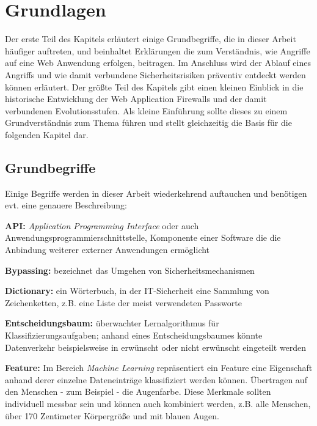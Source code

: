 \chapter{Grundlagen}



Der erste Teil des Kapitels erläutert einige Grundbegriffe, die in dieser Arbeit häufiger auftreten, und beinhaltet Erklärungen die zum Verständnis, wie Angriffe auf eine Web Anwendung erfolgen, beitragen. Im Anschluss wird der Ablauf eines Angriffs und wie damit verbundene Sicherheitsrisiken präventiv entdeckt werden können erläutert. Der größte Teil des Kapitels gibt einen kleinen Einblick in die historische Entwicklung der Web Application Firewalls und der damit verbundenen Evolutionsstufen. Als kleine Einführung sollte dieses zu einem Grundverständnis zum Thema führen und stellt gleichzeitig die Basis für die folgenden Kapitel dar.

\section{Grundbegriffe}
Einige Begriffe werden in dieser Arbeit wiederkehrend auftauchen und benötigen evt. eine genauere Beschreibung:

\textbf{API:} \emph{Application Programming Interface} oder auch Anwendungsprogrammierschnittstelle, Komponente einer Software die die Anbindung weiterer externer Anwendungen ermöglicht

\textbf{Bypassing:} bezeichnet das Umgehen von Sicherheitsmechanismen

\textbf{Dictionary:} ein Wörterbuch, in der IT-Sicherheit eine Sammlung von Zeichenketten, z.B. eine Liste der meist verwendeten Passworte

\textbf{Entscheidungsbaum:} überwachter Lernalgorithmus für Klassifizierungsaufgaben; anhand eines Entscheidungsbaumes könnte Datenverkehr beispielsweise in erwünscht oder nicht erwünscht eingeteilt werden

\textbf{Feature:} Im Bereich \emph{Machine Learning} repräsentiert ein Feature eine Eigenschaft anhand derer einzelne Dateneinträge klassifiziert werden können. Übertragen auf den Menschen - zum Beispiel - die Augenfarbe. Diese Merkmale sollten individuell messbar sein und können auch kombiniert werden, z.B. alle Menschen, über 170 Zentimeter Körpergröße und mit blauen Augen. 

